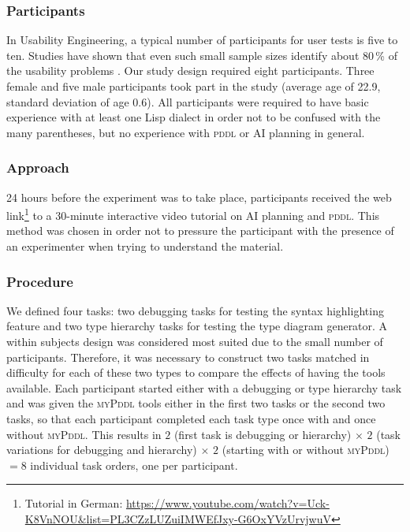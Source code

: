 \documentclass[runningheads]{llncs}
\newcommand{\mypddl}{\textsc{myPddl}\xspace}
\newcommand{\pddl}{\textsc{pddl}\xspace}
\begin{document}
\subsubsection{Participants}

In Usability Engineering, a typical number of participants for user
tests is five to ten. Studies have shown that even such small sample
sizes identify about 80\,\% of the usability problems
\cite{nielsen1994estimating,hwang2010number}. Our study design
required eight participants. Three female and five male participants
took part in the study (average age of 22.9, standard deviation of age
0.6). All participants were required to have basic experience with at
least one Lisp dialect in order not to be confused with the many
parentheses, but no experience with \pddl or AI planning in general.

\subsubsection{Approach}

24 hours before the experiment was to take place, participants
received the web
link\footnote{Tutorial in German: \url{https://www.youtube.com/watch?v=Uck-K8VnNOU&list=PL3CZzLUZuiIMWEfJxy-G6OxYVzUrvjwuV}} to a 30-minute interactive video tutorial
on AI planning and \pddl. This method was chosen in order not to
pressure the participant with the presence of an experimenter when
trying to understand the material.

\subsubsection{Procedure}

We defined four tasks: two debugging tasks for testing the syntax
highlighting feature and two type hierarchy tasks for testing the type
diagram generator. A within subjects design was considered most suited
due to the small number of participants. Therefore, it was necessary to
construct two tasks matched in difficulty for each of these two
types to compare the effects of having the tools available. Each
participant started either with a debugging or type hierarchy task and
was given the \mypddl tools either in the first two tasks or the
second two tasks, so that each participant completed each task type
once with and once without \mypddl. This results in $2$ (first task is
debugging or hierarchy) $\times$ $2$ (task variations for debugging
and hierarchy) $\times$ $2$ (starting with or without \mypddl) $= 8$
individual task orders, one per participant.
\end{document}
